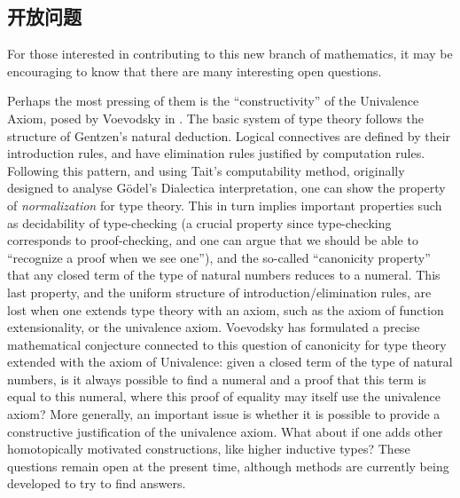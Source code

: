 %

\subsection*{开放问题} 

%

For those interested in contributing to this new branch of mathematics, it may be encouraging to know that there are many interesting open questions.

%
Perhaps the most pressing of them is the ``constructivity'' of the Univalence Axiom, posed by Voevodsky in \cite{Universe-poly}.
The basic system of type theory follows the structure of Gentzen's natural deduction. Logical connectives are defined by their introduction rules,
and have elimination rules justified by computation rules. Following this pattern, and using Tait's computability method,
originally designed to analyse G\"odel's Dialectica interpretation, one can show the property of \emph{normalization} for type theory.
This in turn implies important properties such as decidability of type-checking
(a crucial property since type-checking corresponds to proof-checking, and one can argue that we should be able to ``recognize a proof when we see one''),
and the so-called ``canonicity property'' that any closed term of the type of natural numbers reduces to a numeral. This last property,
and the uniform structure of introduction/elimination rules, are lost when one extends type theory with an axiom, such as the axiom of function extensionality,
or the univalence axiom. Voevodsky has formulated a precise mathematical conjecture connected to this question of canonicity for type theory extended with 
the axiom of Univalence: given a closed term of the type of natural numbers, is it always possible to find a numeral and a proof that this term is equal to this numeral,
where this proof of equality may itself use the univalence axiom? More generally,
an important issue is whether it is possible to provide a constructive justification of the univalence axiom.
What about if one adds other homotopically motivated constructions, like higher inductive types?
These questions remain open at the present time, although methods are currently being developed to try to find answers.

